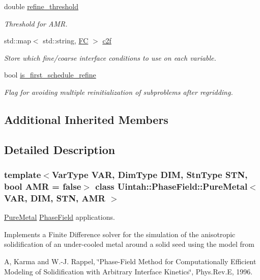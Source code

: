 \begin{DoxyCompactItemize}
double \hyperlink{classUintah_1_1PhaseField_1_1PureMetal_a2a3f55ea47378bda5ac49dd7af58e3a6}{refine\+\_\+threshold}
\begin{DoxyCompactList}\small\item\em Threshold for A\+MR. \end{DoxyCompactList}\item 
std\+::map$<$ std\+::string, \hyperlink{namespaceUintah_1_1PhaseField_aeb51fe956fe07f1487f5878f4039f27c}{FC} $>$ \hyperlink{classUintah_1_1PhaseField_1_1PureMetal_ac5f2288bfc3ee4c2d1291f9d15759aed}{c2f}
\begin{DoxyCompactList}\small\item\em Store which fine/coarse interface conditions to use on each variable. \end{DoxyCompactList}\item 
bool \hyperlink{classUintah_1_1PhaseField_1_1PureMetal_a6dcdb69ac56c14536ad7103268d1c3f6}{is\+\_\+first\+\_\+schedule\+\_\+refine}
\begin{DoxyCompactList}\small\item\em Flag for avoiding multiple reinitialization of subproblems after regridding. \end{DoxyCompactList}\end{DoxyCompactItemize}
\subsection*{Additional Inherited Members}


\subsection{Detailed Description}
\subsubsection*{template$<$Var\+Type V\+AR, Dim\+Type D\+IM, Stn\+Type S\+TN, bool A\+MR = false$>$\newline
class Uintah\+::\+Phase\+Field\+::\+Pure\+Metal$<$ V\+A\+R, D\+I\+M, S\+T\+N, A\+M\+R $>$}

\hyperlink{classUintah_1_1PhaseField_1_1PureMetal}{Pure\+Metal} \hyperlink{namespaceUintah_1_1PhaseField}{Phase\+Field} applications. 

Implements a Finite Difference solver for the simulation of the anisotropic solidification of an under-\/cooled metal around a solid seed using the model from

A, Karma and W.-\/J. Rappel, \char`\"{}\+Phase-\/\+Field Method for Computationally Efficient Modeling of Solidification
with Arbitrary Interface Kinetics\char`\"{}, Phys.\+Rev.\+E, 1996.

